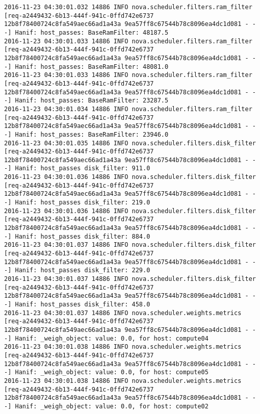 \begin{lstlisting}[frame=single, caption={The filter scheduler log trace for 10 virtual instances}, label={lst:filterschedulercodetracelog10vi}, escapechar=|]
2016-11-23 04:30:01.032 14886 INFO nova.scheduler.filters.ram_filter [req-a2449432-6b13-444f-941c-0ffd742e6737 12b8f78400724c8fa549aec66ad1a43a 9ea57ff8c67544b78c8096ea4dc1d081 - - -] Hanif: host_passes: BaseRamFilter: 48187.5
2016-11-23 04:30:01.033 14886 INFO nova.scheduler.filters.ram_filter [req-a2449432-6b13-444f-941c-0ffd742e6737 12b8f78400724c8fa549aec66ad1a43a 9ea57ff8c67544b78c8096ea4dc1d081 - - -] Hanif: host_passes: BaseRamFilter: 48081.0
2016-11-23 04:30:01.033 14886 INFO nova.scheduler.filters.ram_filter [req-a2449432-6b13-444f-941c-0ffd742e6737 12b8f78400724c8fa549aec66ad1a43a 9ea57ff8c67544b78c8096ea4dc1d081 - - -] Hanif: host_passes: BaseRamFilter: 23287.5
2016-11-23 04:30:01.034 14886 INFO nova.scheduler.filters.ram_filter [req-a2449432-6b13-444f-941c-0ffd742e6737 12b8f78400724c8fa549aec66ad1a43a 9ea57ff8c67544b78c8096ea4dc1d081 - - -] Hanif: host_passes: BaseRamFilter: 23946.0
2016-11-23 04:30:01.035 14886 INFO nova.scheduler.filters.disk_filter [req-a2449432-6b13-444f-941c-0ffd742e6737 12b8f78400724c8fa549aec66ad1a43a 9ea57ff8c67544b78c8096ea4dc1d081 - - -] Hanif: host_passes disk_filter: 911.0
2016-11-23 04:30:01.036 14886 INFO nova.scheduler.filters.disk_filter [req-a2449432-6b13-444f-941c-0ffd742e6737 12b8f78400724c8fa549aec66ad1a43a 9ea57ff8c67544b78c8096ea4dc1d081 - - -] Hanif: host_passes disk_filter: 219.0
2016-11-23 04:30:01.036 14886 INFO nova.scheduler.filters.disk_filter [req-a2449432-6b13-444f-941c-0ffd742e6737 12b8f78400724c8fa549aec66ad1a43a 9ea57ff8c67544b78c8096ea4dc1d081 - - -] Hanif: host_passes disk_filter: 884.0
2016-11-23 04:30:01.037 14886 INFO nova.scheduler.filters.disk_filter [req-a2449432-6b13-444f-941c-0ffd742e6737 12b8f78400724c8fa549aec66ad1a43a 9ea57ff8c67544b78c8096ea4dc1d081 - - -] Hanif: host_passes disk_filter: 229.0
2016-11-23 04:30:01.037 14886 INFO nova.scheduler.filters.disk_filter [req-a2449432-6b13-444f-941c-0ffd742e6737 12b8f78400724c8fa549aec66ad1a43a 9ea57ff8c67544b78c8096ea4dc1d081 - - -] Hanif: host_passes disk_filter: 458.0
2016-11-23 04:30:01.037 14886 INFO nova.scheduler.weights.metrics [req-a2449432-6b13-444f-941c-0ffd742e6737 12b8f78400724c8fa549aec66ad1a43a 9ea57ff8c67544b78c8096ea4dc1d081 - - -] Hanif: _weigh_object: value: 0.0, for host: compute04
2016-11-23 04:30:01.038 14886 INFO nova.scheduler.weights.metrics [req-a2449432-6b13-444f-941c-0ffd742e6737 12b8f78400724c8fa549aec66ad1a43a 9ea57ff8c67544b78c8096ea4dc1d081 - - -] Hanif: _weigh_object: value: 0.0, for host: compute05
2016-11-23 04:30:01.038 14886 INFO nova.scheduler.weights.metrics [req-a2449432-6b13-444f-941c-0ffd742e6737 12b8f78400724c8fa549aec66ad1a43a 9ea57ff8c67544b78c8096ea4dc1d081 - - -] Hanif: _weigh_object: value: 0.0, for host: compute02

\end{lstlisting}
